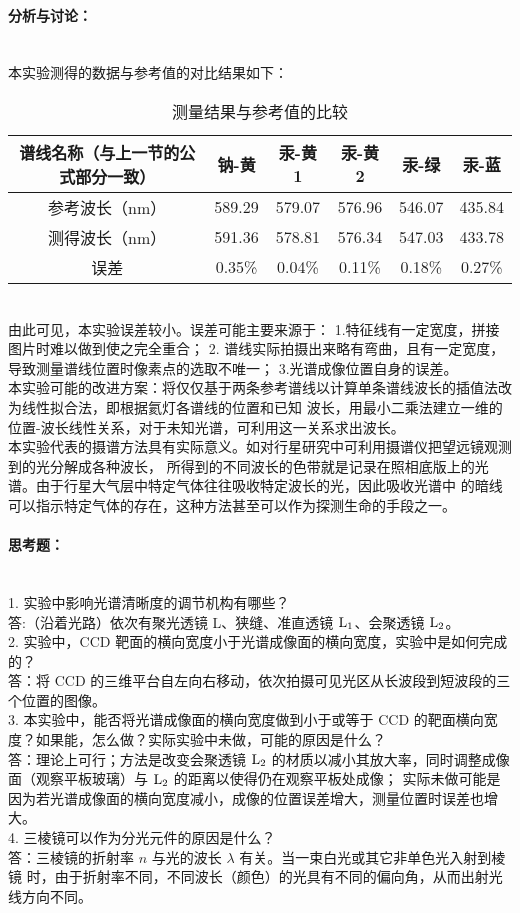\documentclass[UTF8]{ctexart}
\begin{document}
\paragraph*{分析与讨论：}~\\
\indent 本实验测得的数据与参考值的对比结果如下：
\begin{table}[H]
    \centering
    \caption{测量结果与参考值的比较}
    \begin{tabular}{cccccc}
        \hline
     谱线名称（与上一节的公式部分一致）& 钠-黄  & 汞-黄1  & 汞-黄2   & 汞-绿  & 汞-蓝\\
    \hline
   参考波长（nm） &589.29 &579.07 &576.96 &546.07 &435.84\\
   测得波长（nm） &591.36 &578.81 &576.34 &547.03 &433.78\\
   误差 &0.35\% &0.04\% &0.11\% &0.18\% &0.27\%\\
    \hline    
    \end{tabular}
    \end{table}~\\
由此可见，本实验误差较小。误差可能主要来源于： 1.特征线有一定宽度，拼接图片时难以做到使之完全重合； 2.
谱线实际拍摄出来略有弯曲，且有一定宽度，导致测量谱线位置时像素点的选取不唯一； 3.光谱成像位置自身的误差。 ~\\
\indent 本实验可能的改进方案：将仅仅基于两条参考谱线以计算单条谱线波长的插值法改为线性拟合法，即根据氦灯各谱线的位置和已知
波长，用最小二乘法建立一维的位置-波长线性关系，对于未知光谱，可利用这一关系求出波长。~\\
\indent 本实验代表的摄谱方法具有实际意义。如对行星研究中可利用摄谱仪把望远镜观测到的光分解成各种波长，
所得到的不同波长的色带就是记录在照相底版上的光谱。由于行星大气层中特定气体往往吸收特定波长的光，因此吸收光谱中
的暗线可以指示特定气体的存在，这种方法甚至可以作为探测生命的手段之一。~\\

\paragraph*{思考题：}~\\
1. 实验中影响光谱清晰度的调节机构有哪些？~\\
答:（沿着光路）依次有聚光透镜 L、狭缝、准直透镜 $\rm{L}_1$、会聚透镜 $\rm{L}_2$。~\\
2. 实验中，CCD 靶面的横向宽度小于光谱成像面的横向宽度，实验中是如何完成的？~\\
答：将 CCD 的三维平台自左向右移动，依次拍摄可见光区从长波段到短波段的三个位置的图像。~\\
3. 本实验中，能否将光谱成像面的横向宽度做到小于或等于 CCD 的靶面横向宽
度？如果能，怎么做？实际实验中未做，可能的原因是什么？~\\
答：理论上可行；方法是改变会聚透镜 $\rm{L}_2$ 的材质以减小其放大率，同时调整成像面（观察平板玻璃）与 $\rm{L}_2$ 的距离以使得仍在观察平板处成像；
实际未做可能是因为若光谱成像面的横向宽度减小，成像的位置误差增大，测量位置时误差也增大。~\\
4. 三棱镜可以作为分光元件的原因是什么？~\\
答：三棱镜的折射率 $n$ 与光的波长 $\lambda$ 有关。当一束白光或其它非单色光入射到棱镜
时，由于折射率不同，不同波长（颜色）的光具有不同的偏向角，从而出射光线方向不同。
\clearpage 

\label{unknown}
\end{document}
